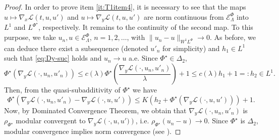 \documentclass[twoside]{article}
\theoremstyle{remark}
\newcommand{\lphi}{L^{\Phi}}
\newcommand{\lpsi}{L^{\Phi^{\star}}}
\newcommand{\sobnor}{\|_{W^{1}\lphi}}
\newcommand{\domi}{\mathcal{E}^{\Phi}}
\renewcommand{\leq}{\leqslant}
\begin{document}
\begin{proof}
In order to prove item  \ref{it:T1item4}, it is necessary to see that the maps \linebreak[4]$u\mapsto \nabla_x\mathcal{L}(t,u,u')$  
and $u\mapsto \nabla_y\mathcal{L}(t,u,u')$  are norm continuous
from $\domi_{\Lambda} $ into $L^1$ and
 $\lpsi$, respectively.  
It remains to the continuity of the second map. 
To this purpose, we take  $u_n, u \in \domi_{\Lambda}$, $n=1,2,\dots$, with $\|u_n- u\sobnor\to 0$.  
As before, we can deduce there exist a subsequence (denoted $u'_n$ for simplicity) and $h_1 \in L^1$ such that \eqref{eq:Dy-suc} holds and $u_n \to u$ a.e.
 Since $\Phi^{\star}\in\Delta_2$, 
\begin{equation}
\Phi^{\star}(\nabla_y \mathcal{L}(\cdot,u_n,u'_n))\leq c(\lambda) \Phi^{\star}\left(\frac{\nabla_y \mathcal{L}(\cdot,u_n,u'_n)}{\lambda}\right)+1\leq c(\lambda)h_1+1=:h_2\in L^1.
\end{equation} 
Then, from the quasi-subadditivity of $\Phi^{\star}$ we have 
\[\Phi^{\star}\left(\nabla_y \mathcal{L}(\cdot,u_n,u'_n)-
\nabla_y \mathcal{L}(\cdot,u,u')\right)\leq K (h_2+\Phi^{\star}(\nabla_y \mathcal{L}(\cdot,u,u')))+1.\]
Now, by Dominated Convergence Theorem, we obtain that 
$\nabla_y \mathcal{L}(\cdot,u_n,u'_n)$ is $\rho_{\Phi^{\star}}$ modular convergent to $\nabla_y \mathcal{L}\left(\cdot,u,u')\right)$, i.e.
$\rho_{\Phi^{\star}}(u_n-u)\to 0$. 
Since $\Phi^{\star}$ is $\Delta_2$, modular convergence implies norm convergence (see \cite{Skaff1969}).
\end{proof}
\end{document}
